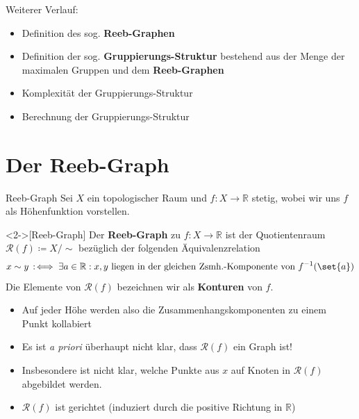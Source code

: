 \documentclass[
wide,
10pt,
xcolor={x11names,svgnames},
hyperref={pdfauthor={Jannes Bantje},colorlinks,urlcolor=maincolor,hidelinks=false,linkcolor=maincolor},
pantone312, 	%
euler-digits,
]{beamer}
\DeclareRobustCommand{\GrpStruktur}{Gruppierungs-Struktur\xspace}
\newcommand{\Index}[1]{\bet{#1}}
\newcommand{\bet}[1]{\textbf{\color{maincolor}#1}}
\theoremstyle{definition}
\begin{document}
\begin{frame}
    Weiterer Verlauf:
    \begin{itemize}[<+->]
        \item Definition des sog. \bet{Reeb-Graphen}
        \item Definition der sog. \bet{\GrpStruktur} bestehend aus der Menge der maximalen Gruppen und dem \bet{Reeb-Graphen}
        \item Komplexität der \GrpStruktur
        \item Berechnung der \GrpStruktur
    \end{itemize}
\end{frame}

\section{Der Reeb-Graph}

\begin{frame}{Reeb-Graph}
    Sei $X$ ein topologischer Raum und $f \colon X \to \mathbb{R}$ stetig, wobei wir uns $f$ als Höhenfunktion vorstellen.
    \begin{definition}<2->[Reeb-Graph]
    	Der \bet{Reeb-Graph} zu $f \colon X \to \mathbb{R}$ ist der Quotientenraum $\mathcal{R}(f) \coloneqq X/{\sim}$ bezüglich der folgenden Äquivalenzrelation
    	\[
    		x \sim y \,:\mkern-3mu\iff \exists a \in \mathbb{R} : x,y \text{ liegen in der gleichen Zsmh.-Komponente von } f^{-1}(\set{a})
    	\]
    	Die Elemente von $\mathcal{R}(f)$ bezeichnen wir als \Index{Konturen} von $f$.
    \end{definition}
    \begin{itemize}
        \item<3-> Auf jeder Höhe werden also die Zusammenhangskomponenten zu einem Punkt kollabiert
        \item<4-> Es ist \emph{a priori} überhaupt nicht klar, dass $\mathcal{R}(f)$ ein Graph ist!
        \item<5-> Insbesondere ist nicht klar, welche Punkte aus $x$ auf Knoten in $\mathcal{R}(f)$ abgebildet werden.
        \item<6-> $\mathcal{R}(f)$ ist gerichtet (induziert durch die positive Richtung in $\mathbb{R}$)
    \end{itemize}
\end{frame}
\end{document}
